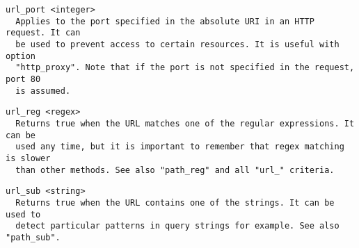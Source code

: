 \begin{verbatim}
url_port <integer>
  Applies to the port specified in the absolute URI in an HTTP request. It can
  be used to prevent access to certain resources. It is useful with option
  "http_proxy". Note that if the port is not specified in the request, port 80
  is assumed.
\end{verbatim}

\begin{verbatim}
url_reg <regex>
  Returns true when the URL matches one of the regular expressions. It can be
  used any time, but it is important to remember that regex matching is slower
  than other methods. See also "path_reg" and all "url_" criteria.
\end{verbatim}

\begin{verbatim}
url_sub <string>
  Returns true when the URL contains one of the strings. It can be used to
  detect particular patterns in query strings for example. See also "path_sub".
\end{verbatim}

